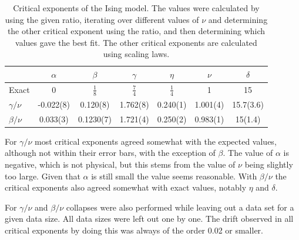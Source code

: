 \documentclass[11pt, a4paper]{report} %
\begin{document}
\begin{table}[htb]
	\centering
	\renewcommand{\arraystretch}{1.5}
	\begin{tabular}{l | c c c c c c}
		\hline
		& \(\alpha\) & \(\beta\) & \(\gamma\) & \(\eta\) & \(\nu\) & \(\delta\) \\\hline
		Exact & 0 & \(\frac{1}{8}\) & \(\frac{7}{4}\) & \(\frac{1}{4}\) & 1 & 15 \\
		\(\gamma/\nu\) & -0.022(8) & 0.120(8) & 1.762(8) & 0.240(1) & 1.001(4) & 15.7(3.6) \\
		\(\beta/\nu\) & 0.033(3) & 0.1230(7) & 1.721(4) & 0.250(2) & 0.983(1) & 15(1.4)\\\hline
	\end{tabular}
	\caption{Critical exponents of the Ising model. The values were calculated by using the given ratio, iterating over different values of \(\nu\) and determining the other critical exponent using the ratio, and then determining which values gave the best fit. The other critical exponents are calculated using scaling laws.}
	\label{tab:ising_critical_exponents}
\end{table}

For \(\gamma/\nu\) most critical exponents agreed somewhat with the expected values, although not within their error bars, with the exception of \(\beta\).
The value of \(\alpha\) is negative, which is not physical, but this stems from the value of \(\nu\) being slightly too large.
Given that \(\alpha\) is still small the value seems reasonable.
With \(\beta/\nu\) the critical exponents also agreed somewhat with exact values, notably \(\eta\) and \(\delta\).

For \(\gamma/\nu\) and \(\beta /\nu\) collapses were also performed while leaving out a data set for a given data size.
All data sizes were left out one by one.
The drift observed in all critical exponents by doing this was always of the order 0.02 or smaller.
\end{document}

